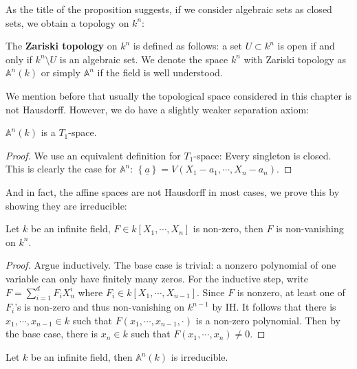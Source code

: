 \documentclass{note-eng}
\begin{document}
As the title of the proposition suggests, if we consider algebraic sets as closed sets, we obtain a topology on $k^n$:

\begin{definition}
    The \textbf{Zariski topology} on $k^n$ is defined as follows: a set $U \subset k^n$ is open if and only if $k^n \setminus U$ is an algebraic set. We denote the space $k^n$ with Zariski topology as $\mathbb{A}^n(k)$ or simply $\mathbb{A}^n$ if the field is well understood.
\end{definition}

We mention before that usually the topological space considered in this chapter is not Hausdorff. However, we do have a slightly weaker separation axiom:

\begin{proposition}
    $\mathbb{A}^n(k)$ is a $T_1$-space.
\end{proposition}

\begin{proof}
    We use an equivalent definition for $T_1$-space: Every singleton is closed. This is clearly the case for $\mathbb{A}^n$: $\left\lbrace \underline{a} \right\rbrace = V(X_1 - a_1, \cdots, X_n - a_n)$.
\end{proof}

And in fact, the affine spaces are not Hausdorff in most cases, we prove this by showing they are irreducible:

\begin{lemma}
    Let $k$ be an infinite field, $F \in k[X_1, \cdots, X_n]$ is non-zero, then $F$ is non-vanishing on $k^n$.
\end{lemma}

\begin{proof}
    Argue inductively. The base case is trivial: a nonzero polynomial of one variable can only have finitely many zeros. For the inductive step, write $F = \sum\limits_{i = 1}^{d} F_iX_n^i$ where $F_i \in k[X_1, \cdots, X_{n - 1}]$. Since $F$ is nonzero, at least one of $F_i$'s is non-zero and thus non-vanishing on $k^{n - 1}$ by IH. It follows that there is $x_1, \cdots, x_{n - 1} \in k$ such that $F(x_1, \cdots, x_{n - 1}, \cdot)$ is a non-zero polynomial. Then by the base case, there is $x_{n} \in k$ such that $F(x_1, \cdots, x_n) \ne 0$.
\end{proof}

\begin{proposition}
    Let $k$ be an infinite field, then $\mathbb{A}^n(k)$ is irreducible.
\end{proposition}
\end{document}
